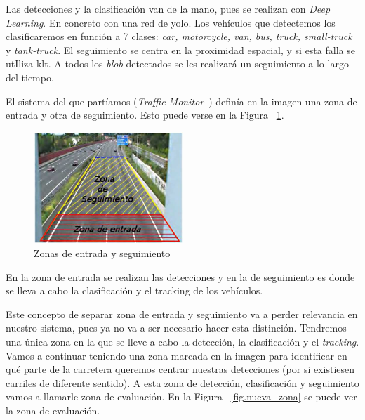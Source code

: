 Las detecciones y la clasificación van de la mano, pues se realizan con \textit{Deep Learning}. En concreto con una red de \acrshort{yolo}. Los vehículos que detectemos los clasificaremos en función a 7 clases:  \textit{car, motorcycle, van, bus, truck, small-truck} y \textit{tank-truck}. 
El seguimiento se centra en la proximidad espacial, y si esta falla se utIliza \acrshort{klt}. A todos los \textit{blob} detectados se les realizará un seguimiento a lo largo del tiempo. 

El sistema del que partíamos (\textit{Traffic-Monitor}~\cite{traffic_monitor_redo}) definía en la imagen una zona de entrada y otra de seguimiento. Esto puede verse en la Figura ~\ref{fig.zonas}.

\begin{figure}[H] 
\begin{center}
	\includegraphics[width=0.5\textwidth]{figures/Diseno_global/zonas.jpg}
   \caption{Zonas de entrada y seguimiento}
	\label{fig.zonas}
\end{center}
\end{figure}

En la zona de entrada se realizan las detecciones y en la de seguimiento es donde se lleva a cabo la clasificación y el tracking de los vehículos.

Este concepto de separar zona de entrada y seguimiento va a perder relevancia en nuestro sistema, pues ya no va a ser necesario hacer esta distinción. Tendremos una única zona en la que se lleve a cabo la detección, la clasificación y el \textit{tracking}. Vamos a continuar teniendo una zona marcada en la imagen para identificar en qué parte de la carretera queremos centrar nuestras detecciones (por si existiesen carriles de diferente sentido). A esta zona de detección, clasificación y seguimiento vamos a llamarle zona de evaluación. En la Figura ~\ref{fig.nueva_zona} se puede ver la zona  de evaluación.

